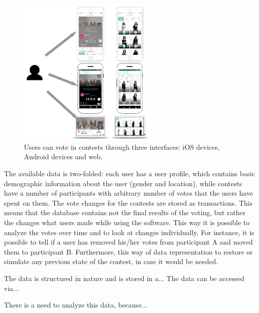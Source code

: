     \begin{figure}[h] 
        \begin{center}
            \includegraphics[width=0.6\textwidth]{images/choicely_platforms.png}
            \caption{Users can vote in contests through three interfaces: iOS devices, Android devices and web.}
            \label{choicely_platforms}
        \end{center}
    \end{figure}

    The available data is two-folded: each user has a user profile, which contains basic demographic information about the user (gender and location), while contests have a number of participants with arbitrary number of votes that the users have spent on them. The vote changes for the contests are stored as transactions. This means that the database contains not the final results of the voting, but rather the changes what users made while using the software. This way it is possible to analyze the votes over time and to look at changes individually. For instance, it is possible to tell if a user has removed his/her votes from participant A and moved them to participant B. Furthermore, this way of data representation to restore or simulate any previous state of the contest, in case it would be needed.

    The data is structured in nature and is stored in a... The data can be accessed via...

    There is a need to analyze this data, because...
    
